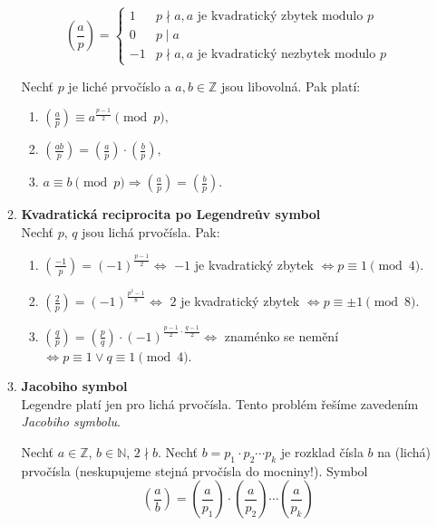 \documentclass[12pt,a4paper]{article}
\begin{document}
\begin{enumerate}[leftmargin=*]
\begin{enumerate}
			\[ \genfrac(){}{0}{a}{p} = \left\{
			\begin{array}{ll}
			1 & p \nmid a, a \text{ je kvadratický zbytek modulo } p \\
			0 & p \mid a \\
			-1& p \nmid a, a \text{ je kvadratický nezbytek modulo } p
			\end{array}
			\right. \]
			
			Nechť $p$ je liché prvočíslo a $a, b \in \mathbb{Z}$ jsou libovolná.
			Pak platí:
			
			\begin{enumerate}
				\item $\genfrac(){}{1}{a}{p} \equiv  a^{\frac{p-1}{2}} \pmod{p},$
				\item $\genfrac(){}{1}{ab}{p} = \genfrac(){}{1}{a}{p} \cdot
				\genfrac(){}{1}{b}{p},$
				\item $a \equiv b \pmod{p} \Rightarrow \genfrac(){}{1}{a}{p}
				= \genfrac(){}{1}{b}{p}.$
			\end{enumerate}
			
			\item \textbf{Kvadratická reciprocita po Legendreův symbol}\\
			Nechť $p$, $q$ jsou lichá prvočísla. Pak:
			
			\begin{enumerate}
				\item $\genfrac(){}{1}{-1}{p} = (-1)^{\frac{p-1}{2}} \Leftrightarrow$
				$-1$ je kvadratický zbytek $\Leftrightarrow p \equiv 1 \pmod{4}$.
				\item $\genfrac(){}{1}{2}{p} = (-1)^{\frac{p^2-1}{8}} \Leftrightarrow$
				$2$ je kvadratický zbytek $\Leftrightarrow p \equiv \pm 1
				\pmod{8}$.
				\item $\genfrac(){}{1}{q}{p} = \genfrac(){}{1}{p}{q} \cdot
				(-1)^{\frac{p-1}{2} \cdot \frac{q-1}{2}} \Leftrightarrow$
				znaménko se nemění $\Leftrightarrow p \equiv 1 \vee
				q \equiv 1 \pmod{4}$.
			\end{enumerate}
			
			
			\item \textbf{Jacobiho symbol}\\
			Legendre platí jen pro lichá prvočísla.  Tento problém řešíme zavedením \textit{Jacobiho
				symbolu}.
			
			Nechť $a \in \mathbb{Z}$, $b \in \mathbb{N}$, $2 \nmid b$. Nechť
			$b = p_1 \cdot p_2 \cdots p_k$ je rozklad čísla $b$ na (lichá)
			prvočísla (neskupujeme stejná prvočísla do mocniny!). Symbol
			\[ \genfrac(){}{0}{a}{b} = \genfrac(){}{0}{a}{p_1} \cdot
			\genfrac(){}{0}{a}{p_2} \cdots \genfrac(){}{0}{a}{p_k} \]
			

\end{enumerate}
\end{enumerate}
\end{document}
